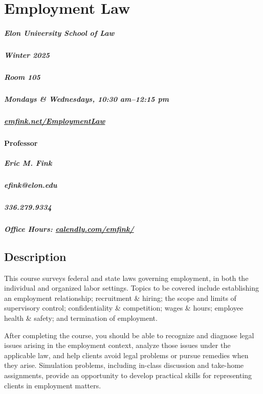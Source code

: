 \documentclass[11pt,letterpaper,twoside]{article}
\begin{document}
\thispagestyle{empty}

\color{OffBlack}


\section{Employment Law}

\begin{footnotesize}
\subparagraph{Elon University School of Law}
\subparagraph{Winter 2025}
\subparagraph{Room 105}
\subparagraph{Mondays \& Wednesdays, 10:30 am--12:15 pm}
\subparagraph{\url{emfink.net/EmploymentLaw}}
\vspace{1em}

\paragraph{Professor}
\subparagraph{Eric M. Fink} 
\subparagraph{efink@elon.edu}
\subparagraph{336.279.9334} 
\subparagraph{Office Hours: {\url{calendly.com/emfink/}}}

\vspace{1em}

\end{footnotesize}

\vspace{1em}


\subsection*{Description}\label{description}

This course surveys federal and state laws governing employment, in both
the individual and organized labor settings. Topics to be covered
include establishing an employment relationship; recruitment \& hiring;
the scope and limits of supervisory control; confidentiality \&
competition; wages \& hours; employee health \& safety; and termination
of employment.

After completing the course, you should be able to recognize and
diagnose legal issues arising in the employment context, analyze those
issues under the applicable law, and help clients avoid legal problems
or pursue remedies when they arise. Simulation problems, including
in-class discussion and take-home assignments, provide an opportunity to
develop practical skills for representing clients in employment matters.
\end{document}
